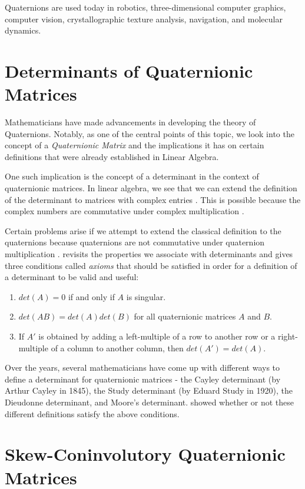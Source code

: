 Quaternions are used today in robotics, three-dimensional computer graphics, computer vision, crystallographic texture analysis, navigation, and molecular dynamics. 

\section{Determinants of Quaternionic Matrices}

Mathematicians have made advancements in developing the theory of Quaternions. Notably, as one of the central points of this topic, we look into the concept of a \emph{Quaternionic Matrix} and the implications it has on certain definitions that were already established in Linear Algebra. 

One such implication is the concept of a determinant in the context of quaternionic matrices. In linear algebra, we see that we can extend the definition of the determinant to matrices with complex entries \cite{stamaria}. This is possible because the complex numbers are commutative under complex multiplication \cite{aslaksen}. 

Certain problems arise if we attempt to extend the classical definition to the quaternions because quaternions are not commutative under quaternion multiplication \cite{aslaksen}. \cite{aslaksen} revisits the properties we associate with determinants and gives three conditions called \emph{axioms} that should be satisfied in order for a definition of a determinant to be valid and useful:
\begin{enumerate}
	\item $det(A) = 0$ if and only if $A$ is singular.
	\item $det(AB) = det(A)det(B)$ for all quaternionic matrices $A$ and $B$.
	\item If $A'$ is obtained by adding a left-multiple of a row to another row or a right-multiple of a column to another column, then $det(A')=det(A)$.
\end{enumerate}

Over the years, several mathematicians have come up with different ways to define a determinant for quaternionic matrices - the Cayley determinant (by Arthur Cayley in 1845), the Study determinant (by Eduard Study in 1920), the Dieudonne determinant, and Moore's determinant. \cite{aslaksen} showed whether or not these different definitions satisfy the above conditions.

\section{Skew-Coninvolutory Quaternionic Matrices}

